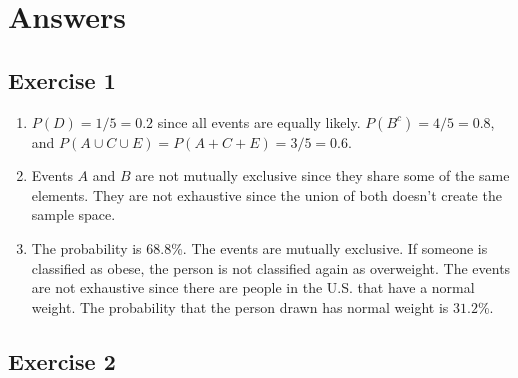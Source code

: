 \documentclass[
  letterpaper,
  DIV=11,
  numbers=noendperiod]{scrreprt}
\begin{document}
\hypertarget{answers-7}{%
\section{Answers}\label{answers-7}}

\hypertarget{exercise-1-15}{%
\subsection*{Exercise 1}\label{exercise-1-15}}

\begin{enumerate}
\def\labelenumi{\arabic{enumi}.}
\item
  \(P(D)=1/5=0.2\) since all events are equally likely.
  \(P(B^c)=4/5=0.8\), and \(P(A \cup C \cup E)=P(A + C + E)=3/5=0.6\).
\item
  Events \(A\) and \(B\) are not mutually exclusive since they share
  some of the same elements. They are not exhaustive since the union of
  both doesn't create the sample space.
\item
  The probability is \(68.8\)\%. The events are mutually exclusive. If
  someone is classified as obese, the person is not classified again as
  overweight. The events are not exhaustive since there are people in
  the U.S. that have a normal weight. The probability that the person
  drawn has normal weight is \(31.2\)\%.
\end{enumerate}

\hypertarget{exercise-2-15}{%
\subsection*{Exercise 2}\label{exercise-2-15}}
\end{document}
